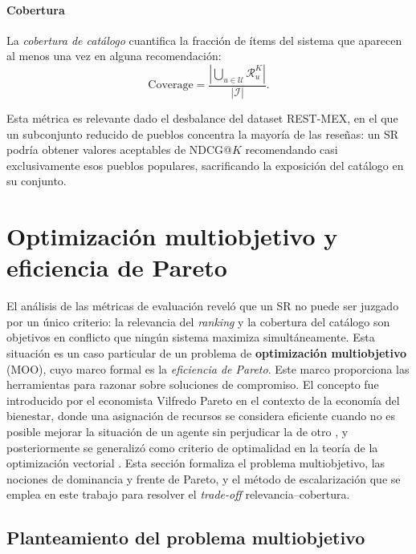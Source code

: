 \paragraph{Cobertura}
La \textit{cobertura de catálogo} cuantifica la fracción de ítems del sistema que aparecen al menos una vez en alguna recomendación:
\begin{equation} \label{eq:coverage}
	\text{Coverage} = \frac{|\bigcup_{u \in \mathcal{U}} \mathcal{R}_u^K|}{|\mathcal{I}|}.
\end{equation}

Esta métrica es relevante dado el desbalance del dataset REST-MEX, en el que un subconjunto reducido de pueblos concentra la mayoría de las reseñas: un SR podría obtener valores aceptables de NDCG@$K$ recomendando casi exclusivamente esos pueblos populares, sacrificando la exposición del catálogo en su conjunto.

\section{Optimización multiobjetivo y eficiencia de Pareto} \label{sec:moo}

El análisis de las métricas de evaluación reveló que un SR no puede ser juzgado por un único criterio: la relevancia del \textit{ranking} y la cobertura del catálogo son objetivos en conflicto que ningún sistema maximiza simultáneamente. Esta situación es un caso particular de un problema de \textbf{optimización multiobjetivo} (MOO), cuyo marco formal es la \textit{eficiencia de Pareto}. Este marco proporciona las herramientas para razonar sobre soluciones de compromiso. El concepto fue introducido por el economista Vilfredo Pareto en el contexto de la economía del bienestar, donde una asignación de recursos se considera eficiente cuando no es posible mejorar la situación de un agente sin perjudicar la de otro \citep{barr2020economics}, y posteriormente se generalizó como criterio de optimalidad en la teoría de la optimización vectorial \citep{miettinen1999nonlinear}. Esta sección formaliza el problema multiobjetivo, las nociones de dominancia y frente de Pareto, y el método de escalarización que se emplea en este trabajo para resolver el \textit{trade-off} relevancia--cobertura.

\subsection{Planteamiento del problema multiobjetivo} \label{subsec:moo_problem}

